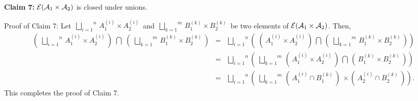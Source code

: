 \vskip 0.5cm
\begin{center}
\begin{minipage}{6.5in}
\textbf{Claim 7:}\quad
$\mathcal{E}\!\left(\mathcal{A}_{1}\times\mathcal{A}_{2}\right)$ is closed under unions.
\end{minipage}
\end{center}
Proof of Claim 7:\quad
Let \,$\overset{n}{\underset{i=1}{\bigsqcup}}\,A_{1}^{(i)} \times A_{2}^{(i)}$\,
and 
\,$\overset{m}{\underset{k=1}{\bigsqcup}}\,B_{1}^{(k)} \times B_{2}^{(k)}$\,
be two elements of $\mathcal{E}\!\left(\mathcal{A}_{1}\times\mathcal{A}_{2}\right)$.
Then,
\begin{eqnarray*}
\left(\;\overset{n}{\underset{i=1}{\bigsqcup}}\,A_{1}^{(i)} \times A_{2}^{(i)}\,\right)
\;\bigcap\;
\left(\;\overset{m}{\underset{k=1}{\bigsqcup}}\,B_{1}^{(k)} \times B_{2}^{(k)}\,\right)
&=&
	\overset{n}{\underset{i=1}{\bigsqcup}}
	\left(\;
		\left(\,A_{1}^{(i)} \times A_{2}^{(i)}\,\right)
		\,\bigcap\,
		\left(\;\overset{m}{\underset{k=1}{\bigsqcup}}\,B_{1}^{(k)} \times B_{2}^{(k)}\,\right)
	\right)
\\
&=&
	\overset{n}{\underset{i=1}{\bigsqcup}}
	\left(\;
		\overset{m}{\underset{k=1}{\bigsqcup}}\,
		\left(\,A_{1}^{(i)} \times A_{2}^{(i)}\,\right)
		\,\bigcap\,
		\left(\,B_{1}^{(k)} \times B_{2}^{(k)}\,\right)
	\right)
\\
&=&
	\overset{n}{\underset{i=1}{\bigsqcup}}
	\left(\;
		\overset{m}{\underset{k=1}{\bigsqcup}}\,
		\left(\,A_{1}^{(i)} \cap B_{1}^{(k)}\,\right)
		\,\times
		\left(\,A_{2}^{(i)} \cap B_{2}^{(k)}\,\right)
	\right).
\end{eqnarray*}
This completes the proof of Claim 7.

